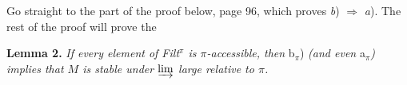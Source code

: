 Go straight to the part of the proof below, page 96, which proves \textit{b}) $\Longrightarrow$ \textit{a}). The rest of the proof will prove the

\textbf{Lemma 2.} \textit{If every element of Filt$^\pi$ is $\pi$-accessible, then} b$_\pi$) \textit{(and even} a$_\pi$\textit{) implies that $M$ is stable under $\varinjlim$ large relative to $\pi$.}
